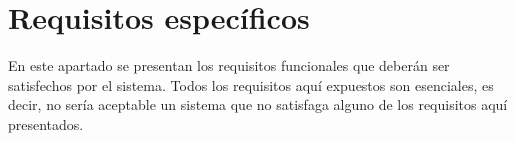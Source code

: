 \section{Requisitos específicos}

En este apartado se presentan los requisitos funcionales que deberán ser satisfechos por el sistema. Todos los requisitos aquí expuestos son esenciales, es decir, no sería aceptable un sistema que no satisfaga alguno de los requisitos aquí presentados.